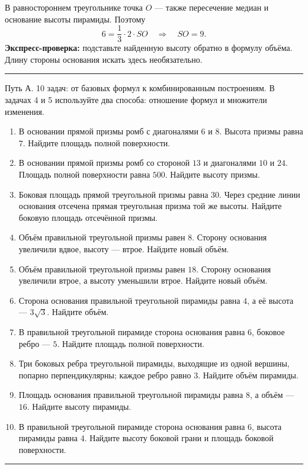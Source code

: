 \documentclass[a4paper,11pt]{article}
\newcommand{\topic}[1]{\vspace{6pt}{\Large\bfseries\color{darkaccent}#1}\par\vspace{4pt}\hrule\vspace{12pt}}
\newcommand{\point}[1]{\textcolor{darkaccent}{\textbf{#1}}}
\begin{document}
В равностороннем треугольнике точка $O$ --- также пересечение медиан и основание высоты пирамиды. Поэтому
\[
6=\frac13\cdot2\cdot SO\quad\Longrightarrow\quad \boxed{SO=9}.
\]
\point{Экспресс-проверка:} подставьте найденную высоту обратно в формулу объёма. Длину стороны основания искать здесь необязательно.

\clearpage
\topic{Тренировочный блок}
\textcolor{muted}{Путь А. 10 задач: от базовых формул к комбинированным построениям. В задачах 4 и 5 используйте два способа: отношение формул и множители изменения.}
\begin{enumerate}[label=\textbf{\arabic*.},itemsep=11pt]
\item В основании прямой призмы ромб с диагоналями $6$ и $8$. Высота призмы равна $7$. Найдите площадь полной поверхности.
\item В основании прямой призмы ромб со стороной $13$ и диагоналями $10$ и $24$. Площадь полной поверхности равна $500$. Найдите высоту призмы.
\item Боковая площадь прямой треугольной призмы равна $30$. Через средние линии основания отсечена прямая треугольная призма той же высоты. Найдите боковую площадь отсечённой призмы.
\item Объём правильной треугольной призмы равен $8$. Сторону основания увеличили вдвое, высоту --- втрое. Найдите новый объём.
\item Объём правильной треугольной призмы равен $18$. Сторону основания увеличили втрое, а высоту уменьшили втрое. Найдите новый объём.
\item Сторона основания правильной треугольной пирамиды равна $4$, а её высота --- $3\sqrt3$. Найдите объём.
\item В правильной треугольной пирамиде сторона основания равна $6$, боковое ребро --- $5$. Найдите площадь полной поверхности.
\item Три боковых ребра треугольной пирамиды, выходящие из одной вершины, попарно перпендикулярны; каждое ребро равно $3$. Найдите объём пирамиды.
\item Площадь основания правильной треугольной пирамиды равна $8$, а объём --- $16$. Найдите высоту пирамиды.
\item В правильной треугольной пирамиде сторона основания равна $6$, высота пирамиды равна $4$. Найдите высоту боковой грани и площадь боковой поверхности.
\end{enumerate}
\clearpage
\topic{Ответы}
\end{document}
